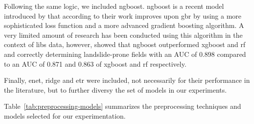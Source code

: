 Following the same logic, we included \gls{ngboost}. 
\gls{ngboost} is a recent model introduced by \citet{ngboost} that according to their work improves upon \gls{gbr} by using a more sophisticated loss function and a more advanced gradient boosting algorithm.
A very limited amount of research has been conducted using this algorithm in the context of \gls{libs} data, however, \citet{ngboost_landslide} showed that \gls{ngboost} outperformed \gls{xgboost} and \gls{rf} and correctly determining landslide-prone fields with an AUC of 0.898 compared to an AUC of 0.871 and 0.863 of \gls{xgboost} and \gls{rf} respectively.

Finally, \gls{enet}, \gls{ridge} and \gls{etr} were included, not necessarily for their performance in the literature, but to further diversy the set of models in our experiments.

Table~\ref{tab:preprocessing-models} summarizes the preprocessing techniques and models selected for our experimentation.

